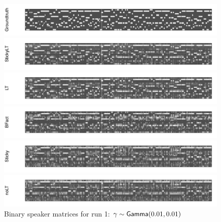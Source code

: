 \begin{figure}[tb]
\begin{center}
  \centerline{\includegraphics[width = \textwidth, height = 0.2\textwidth]{fig/cocktail/synth_s16_m12/hyper_gamma/h10.0_nocs_cp0/a0p01b0p01/groundtruth.pdf}}
  \centerline{\includegraphics[width = \textwidth, height = 0.2\textwidth]{fig/cocktail/synth_s16_m12/hyper_gamma/h10.0_nocs_cp0/a0p01b0p01/StickyLT_hdp_hmm_w0_agamma0p01_bgamma0p01/binary_state.pdf}}
  \centerline{\includegraphics[width = \textwidth, height = 0.2\textwidth]{fig/cocktail/synth_s16_m12/hyper_gamma/h10.0_nocs_cp0/a0p01b0p01/LT_hdp_hmm_w0_agamma0p01_bgamma0p01/binary_state.pdf}}
  \centerline{\includegraphics[width = \textwidth, height = 0.2\textwidth]{fig/cocktail/synth_s16_m12/hyper_gamma/h10.0_nocs_cp0/a0p01b0p01/BFact_hmm_w0_agamma0p01_bgamma0p01/binary_state.pdf}}
  \centerline{\includegraphics[width = \textwidth, height = 0.2\textwidth]{fig/cocktail/synth_s16_m12/hyper_gamma/h10.0_nocs_cp0/a0p01b0p01/Sticky_hdp_hmm_w0_agamma0p01_bgamma0p01/binary_state.pdf}}
  \centerline{\includegraphics[width = \textwidth, height = 0.2\textwidth]{fig/cocktail/synth_s16_m12/hyper_gamma/h10.0_nocs_cp0/a0p01b0p01/noLT_hdp_hmm_w0_agamma0p01_bgamma0p01/binary_state.pdf}}
\caption{Binary speaker matrices for run 1: $\gamma \sim \mathsf{Gamma}(0.01,0.01)$}
\end{center}
\end{figure}


